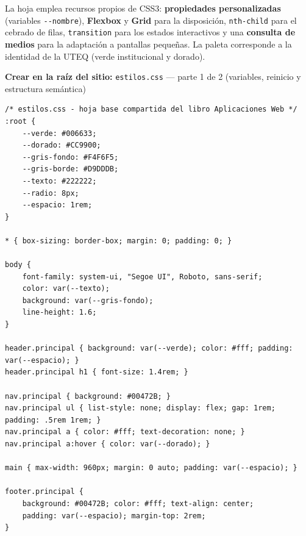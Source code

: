 La hoja emplea recursos propios de CSS3: \textbf{propiedades personalizadas}
(variables \texttt{-{}-nombre}), \textbf{Flexbox} y \textbf{Grid} para la
disposición, \texttt{nth-child} para el cebrado de filas, \texttt{transition}
para los estados interactivos y una \textbf{consulta de medios} para la
adaptación a pantallas pequeñas. La paleta corresponde a la identidad de la
UTEQ (verde institucional y dorado).

{\small\textbf{Crear en la raíz del sitio:} \texttt{estilos.css} --- parte 1 de 2 (variables, reinicio y estructura semántica)}
\begin{lstlisting}[style=css,caption={estilos.css --- parte 1: variables, reinicio y estructura},label={lst:estilos-base-a}]
/* estilos.css - hoja base compartida del libro Aplicaciones Web */
:root {
    --verde: #006633;
    --dorado: #CC9900;
    --gris-fondo: #F4F6F5;
    --gris-borde: #D9DDDB;
    --texto: #222222;
    --radio: 8px;
    --espacio: 1rem;
}

* { box-sizing: border-box; margin: 0; padding: 0; }

body {
    font-family: system-ui, "Segoe UI", Roboto, sans-serif;
    color: var(--texto);
    background: var(--gris-fondo);
    line-height: 1.6;
}

header.principal { background: var(--verde); color: #fff; padding: var(--espacio); }
header.principal h1 { font-size: 1.4rem; }

nav.principal { background: #00472B; }
nav.principal ul { list-style: none; display: flex; gap: 1rem; padding: .5rem 1rem; }
nav.principal a { color: #fff; text-decoration: none; }
nav.principal a:hover { color: var(--dorado); }

main { max-width: 960px; margin: 0 auto; padding: var(--espacio); }

footer.principal {
    background: #00472B; color: #fff; text-align: center;
    padding: var(--espacio); margin-top: 2rem;
}
\end{lstlisting}

